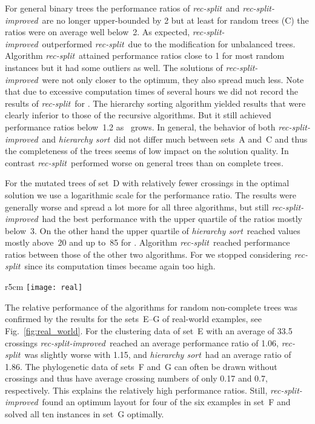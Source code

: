 \documentclass[runningheads,a4paper]{llncs}
\newcommand{\recsplit}{\emph{rec-split}}
\newcommand{\recimproved}{\emph{rec-split-improved}}
\newcommand{\hiersort}{\emph{hierarchy sort}}
\begin{document}
For general binary trees the performance ratios of \recsplit\ and
\recimproved\ are no longer upper-bounded by 2 but at least for random
trees (C) the ratios were on average well below~2. As expected,
\recimproved\ outperformed \recsplit\ due to the modification for
unbalanced trees. Algorithm \recsplit\ attained performance ratios
close to 1 for most random instances but it had some outliers as
well. The solutions of \recimproved\ were not only closer to the
optimum, they also spread much less. Note that due to excessive
computation times of several hours we did not record the results of
\recsplit\ for . The hierarchy sorting algorithm yielded
results that were clearly inferior to those of the recursive
algorithms. But it still achieved performance ratios below~1.2 as~
grows. In general, the behavior of both \recimproved\ and \hiersort\
did not differ much between sets~A and~C and thus the completeness of
the trees seems of low impact on the solution quality. In contrast
\recsplit\ performed worse on general trees than on complete trees.

For the mutated trees of set~D with relatively fewer crossings in the
optimal solution we use a logarithmic scale for the performance
ratio. The results were generally worse and spread a lot more for all
three algorithms, but still \recimproved\ had the best performance
with the upper quartile of the ratios mostly below~3. 
On the other
hand the upper quartile of \hiersort\ reached 
values mostly above~20 and up
to~85 for . Algorithm \recsplit\ reached performance ratios
between those of the other two algorithms. For  we stopped
considering \recsplit\ since its computation times became again too
high.

\begin{wrapfigure}[12]{r}{5cm}
  \centering
  \vspace*{-5ex}
  \texttt{[image: real]}
  \vspace*{-1ex}
  \caption{Performance ratios for real-world examples.}
  \label{fig:real_world}
\end{wrapfigure}
The relative performance of the algorithms for random
non-complete trees was confirmed by the results for the sets~E--G of
real-world examples, see Fig.~\ref{fig:real_world}.
For the clustering data of set~E with an average
of 33.5 crossings \recimproved\ reached an average performance ratio
of 1.06, \recsplit\ was slightly
worse with 1.15, and \hiersort\ had an
average ratio of 1.86. The phylogenetic data of sets~F and~G can often
be drawn without crossings and thus have average crossing numbers of
only 0.17 and 0.7, respectively. This explains the relatively high
performance ratios. Still, \recimproved\ found an optimum layout for
four of the six examples in set~F and solved all ten instances in set~G
optimally.
\end{document}
